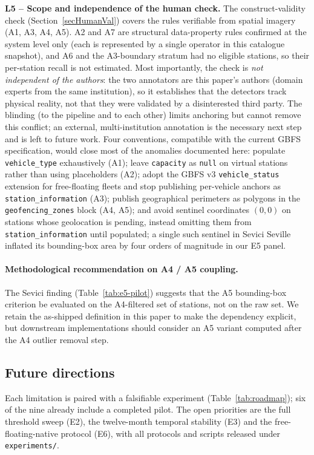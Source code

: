 \documentclass[11pt,a4paper]{article}
\begin{document}
\textbf{L5 -- Scope and independence of the human check.} The
construct-validity check (Section~\ref{secHumanVal}) covers the rules
verifiable from spatial imagery (A1, A3, A4, A5). A2 and A7 are structural
data-property rules confirmed at the system level only (each is represented
by a single operator in this catalogue snapshot), and A6 and the A3-boundary
stratum had no eligible stations, so their per-station recall is not
estimated. Most importantly, the check is \emph{not independent of the
authors}: the two annotators are this paper's authors (domain experts from
the same institution), so it establishes that the detectors track physical
reality, not that they were validated by a disinterested third party. The
blinding (to the pipeline and to each other) limits anchoring but cannot
remove this conflict; an external, multi-institution annotation is the
necessary next step and is left to future work.
Four conventions, compatible with the current GBFS specification,
would close most of the anomalies documented here: populate
\texttt{vehicle\_type} exhaustively (A1); leave \texttt{capacity}
as \texttt{null} on virtual stations rather than using placeholders
(A2); adopt the GBFS v3 \texttt{vehicle\_status} extension for
free-floating fleets and stop publishing per-vehicle anchors as
\texttt{station\_information} (A3); publish geographical perimeters
as polygons in the \texttt{geofencing\_zones} block (A4, A5); and
avoid sentinel coordinates $(0,0)$ on stations whose geolocation is
pending, instead omitting them from \texttt{station\_information}
until populated; a single such sentinel in Sevici Seville
inflated its bounding-box area by four orders of magnitude in our
E5 panel.

\paragraph{Methodological recommendation on A4 / A5 coupling.}
The Sevici finding (Table~\ref{tab:e5-pilot}) suggests that the A5
bounding-box criterion be evaluated on the A4-filtered set of
stations, not on the raw set. We retain the as-shipped definition
in this paper to make the dependency explicit, but downstream
implementations should consider an A5 variant computed after the
A4 outlier removal step.

\subsection{Future directions}
Each limitation is paired with a falsifiable experiment
(Table~\ref{tab:roadmap}); six of the nine already include a completed
pilot. The open priorities are the full threshold sweep (E2), the
twelve-month temporal stability (E3) and the free-floating-native protocol
(E6), with all protocols and scripts released under \texttt{experiments/}.
\end{document}
